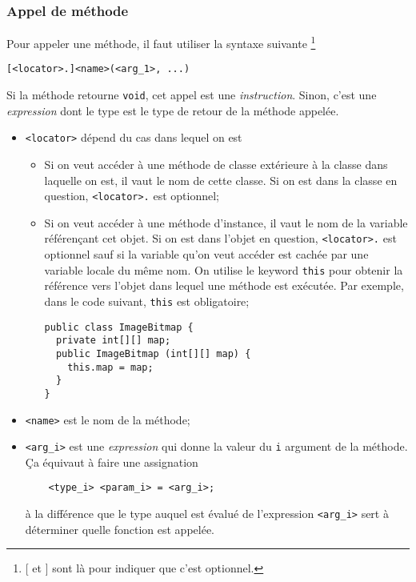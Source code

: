 \subsubsection{Appel de méthode}
Pour appeler une méthode, il faut utiliser la syntaxe suivante
\footnote{[ et ] sont là pour indiquer que c'est optionnel.}
\begin{lstlisting}
[<locator>.]<name>(<arg_1>, ...)
\end{lstlisting}
Si la méthode retourne \lstinline|void|, cet appel est une \emph{instruction}.
Sinon, c'est une \emph{expression}
dont le type est le type de retour de la méthode appelée.
\begin{itemize}
  \item \lstinline|<locator>| dépend du cas dans lequel on est
    \begin{itemize}
      \item Si on veut accéder à une méthode de classe extérieure à la classe
        dans laquelle on est, il vaut le nom de cette classe.
        Si on est dans la classe en question,
        \lstinline|<locator>.| est optionnel;
      \item Si on veut accéder à une méthode d'instance, il vaut le nom
        de la variable référençant cet objet.
        Si on est dans l'objet en question, \lstinline|<locator>.| est optionnel
        sauf si la variable qu'on veut accéder est cachée par une variable
        locale du même nom.
        On utilise le keyword \lstinline|this| pour obtenir la référence vers
        l'objet dans lequel une méthode est exécutée.
        Par exemple, dans le code suivant, \lstinline|this| est obligatoire;
        \begin{lstlisting}
public class ImageBitmap {
  private int[][] map;
  public ImageBitmap (int[][] map) {
    this.map = map;
  }
}
        \end{lstlisting}
    \end{itemize}
  \item \lstinline|<name>| est le nom de la méthode;
  \item \lstinline|<arg_i>| est une \emph{expression} qui donne la valeur
    du \lstinline|i|\ieme{} argument de la méthode.
    Ça équivaut à faire une assignation
    \begin{lstlisting}
    <type_i> <param_i> = <arg_i>;
    \end{lstlisting}
    à la différence que le type auquel est évalué de l'expression
    \lstinline|<arg_i>| sert à déterminer quelle fonction est appelée.


\end{itemize}
